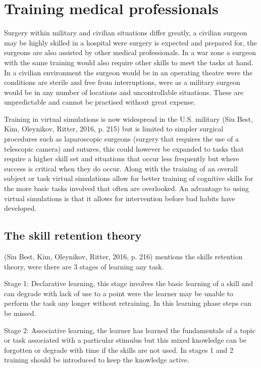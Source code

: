 \documentclass[10pt,journal,compsoc]{IEEEtran}
\begin{document}
	\section{Training medical professionals}	
	Surgery within military and civilian situations differ greatly, a civilian surgeon may be highly skilled in a hospital were surgery is expected and prepared for, the surgeons are also assisted by other medical professionals. In a war zone a surgeon with the same training would also require other skills to meet the tasks at hand. In a civilian environment the surgeon would be in an operating theatre were the conditions are sterile and free from interruptions, were as a military surgeon would be in any number of locations and uncontrollable situations. These are unpredictable and cannot be practised without great expense. \newline
	
	Training in virtual simulations is now widespread in the U.S. military (Siu Best, Kim, Oleynikov, Ritter, 2016, p. 215) but is limited to simpler surgical procedures such as laparoscopic surgeons (surgery that requires the use of a telescopic camera) and sutures, this could however be expanded to tasks that require a higher skill set and situations that occur less frequently but where success is critical when they do occur. Along with the training of an overall subject or task virtual simulations allow for better training of cognitive skills for the more basic tasks involved that often are overlooked. An advantage to using virtual simulations is that it allows for intervention before bad habits have developed. 
	
	\subsection{The skill retention theory}
	(Siu Best, Kim, Oleynikov, Ritter, 2016, p. 216) mentions the skills retention theory, were there are 3 stages of learning any task. \newline
	
	Stage  1: Declarative learning, this stage involves the basic learning of a skill and can degrade with lack of use to a point were the learner may be unable to perform the task any longer without retraining. In this learning phase steps can be missed. \newline 
	
	Stage 2: Associative  learning, the learner has learned the fundamentals of a topic or task associated with a particular stimulus but this mixed knowledge can be forgotten or degrade with time if the skills are not used. In stages 1 and 2 training should be introduced to keep the knowledge active.\newline
	
\end{document}

